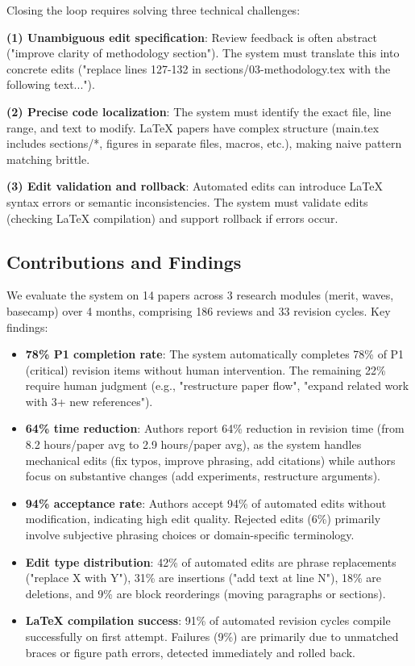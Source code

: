 Closing the loop requires solving three technical challenges:

\textbf{(1) Unambiguous edit specification}: Review feedback is often abstract ("improve clarity of methodology section"). The system must translate this into concrete edits ("replace lines 127-132 in sections/03-methodology.tex with the following text...").

\textbf{(2) Precise code localization}: The system must identify the exact file, line range, and text to modify. LaTeX papers have complex structure (main.tex includes sections/*, figures in separate files, macros, etc.), making naive pattern matching brittle.

\textbf{(3) Edit validation and rollback}: Automated edits can introduce LaTeX syntax errors or semantic inconsistencies. The system must validate edits (checking LaTeX compilation) and support rollback if errors occur.

\subsection{Contributions and Findings}

We evaluate the system on 14 papers across 3 research modules (merit, waves, basecamp) over 4 months, comprising 186 reviews and 33 revision cycles. Key findings:

\begin{itemize}
\item \textbf{78\% P1 completion rate}: The system automatically completes 78\% of P1 (critical) revision items without human intervention. The remaining 22\% require human judgment (e.g., "restructure paper flow", "expand related work with 3+ new references").

\item \textbf{64\% time reduction}: Authors report 64\% reduction in revision time (from 8.2 hours/paper avg to 2.9 hours/paper avg), as the system handles mechanical edits (fix typos, improve phrasing, add citations) while authors focus on substantive changes (add experiments, restructure arguments).

\item \textbf{94\% acceptance rate}: Authors accept 94\% of automated edits without modification, indicating high edit quality. Rejected edits (6\%) primarily involve subjective phrasing choices or domain-specific terminology.

\item \textbf{Edit type distribution}: 42\% of automated edits are phrase replacements ("replace X with Y"), 31\% are insertions ("add text at line N"), 18\% are deletions, and 9\% are block reorderings (moving paragraphs or sections).

\item \textbf{LaTeX compilation success}: 91\% of automated revision cycles compile successfully on first attempt. Failures (9\%) are primarily due to unmatched braces or figure path errors, detected immediately and rolled back.
\end{itemize}

